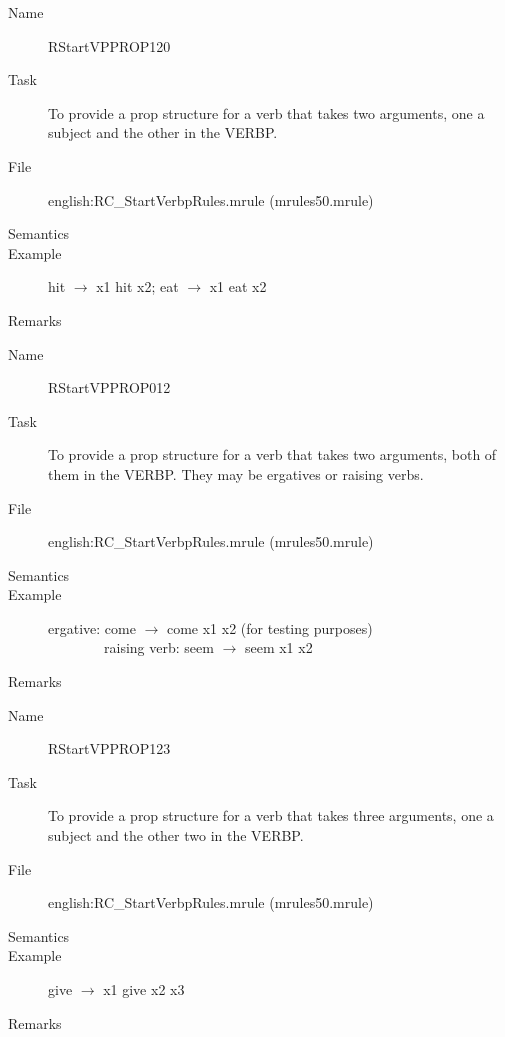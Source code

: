 \begin{description}
\vspace{1 cm}
\begin{description}
\item[Name] RStartVPPROP120
\item[Task] To provide a prop structure for a verb that 
takes two arguments, one a subject and the other in the VERBP.
\item[File] english:RC\_StartVerbpRules.mrule (mrules50.mrule)
\item[Semantics]
\item[Example] hit $\rightarrow$ x1 hit x2; eat $\rightarrow$ x1 eat x2
\item[Remarks]
\end{description}

\vspace{1 cm}
\begin{description}
\item[Name] RStartVPPROP012
\item[Task] To provide a prop structure for a verb that takes two arguments, 
both of them in the VERBP. They may be ergatives or raising verbs.
\item[File] english:RC\_StartVerbpRules.mrule (mrules50.mrule)
\item[Semantics]
\item[Example] ergative: come $\rightarrow$ come x1 x2 (for testing purposes)\\
\ \ \ \ \ \ \ \ raising verb: seem $\rightarrow$ seem x1 x2
\item[Remarks]
\end{description}

\vspace{1 cm}
\begin{description}
\item[Name] RStartVPPROP123
\item[Task] To provide a prop structure for a verb that takes three arguments,
one a subject and the other two in the VERBP.
\item[File] english:RC\_StartVerbpRules.mrule (mrules50.mrule)
\item[Semantics]
\item[Example] give $\rightarrow$ x1 give x2 x3
\item[Remarks]
\end{description}


\end{description}
